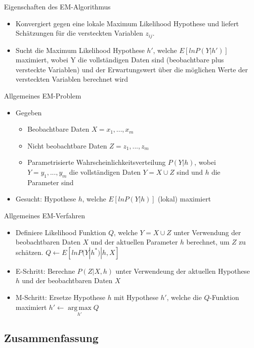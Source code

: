 \documentclass[paper=a4, fontsize=11pt]{scrartcl} %
\numberwithin{equation}{section} %
\numberwithin{figure}{section} %
\numberwithin{table}{section} %
\DeclareMathOperator*{\argmax}{arg\,max}
\begin{document}
Eigenschaften des EM-Algorithmus
\begin{itemize}
\item Konvergiert gegen eine lokale Maximum Likelihood Hypothese und liefert Schätzungen für die versteckten Variablen $z_{ij}$.
\item Sucht die Maximum Likelihood Hypothese $h'$, welche $E[lnP(Y|h')]$ maximiert, wobei Y die vollständigen Daten sind (beobachtbare plus versteckte Variablen) und der Erwartungswert über die möglichen Werte der versteckten Variablen berechnet wird
\end{itemize}

Allgemeines EM-Problem
\begin{itemize}
\item Gegeben
\begin{itemize}
\item Beobachtbare Daten $X={x_1,...,x_m}$
\item Nicht beobachtbare Daten $Z={z_1,...,z_m}$
\item Parametrisierte Wahrscheinlichkeitsverteilung $P(Y|h)$, wobei $Y={y_1,...,y_m}$ die vollständigen Daten $Y = X \cup Z$ sind und $h$ die Parameter sind
\end{itemize}
\item Gesucht: Hypothese $h$, welche $E[lnP(Y|h)]$ (lokal) maximiert
\end{itemize}

Allgemeines EM-Verfahren
\begin{itemize}
\item Definiere Likelihood Funktion $Q$, welche $Y = X \cup Z$ unter Verwendung der beobachtbaren Daten $X$ und der aktuellen Parameter $h$ berechnet, um $Z$ zu schätzen. $Q \leftarrow E[ln P(Y|h^*)|h,X]$
\item E-Schritt: Berechne $P(Z|X,h)$ unter Verwendeung der aktuellen Hypothese $h$ und der beobachtbaren Daten $X$
\item M-Schritt: Ersetze Hypothese $h$ mit Hypothese $h'$, welche die $Q$-Funktion maximiert $h' \leftarrow \argmax\limits_{h'}Q$
\end{itemize}

\subsection{Zusammenfassung}
\end{document}
